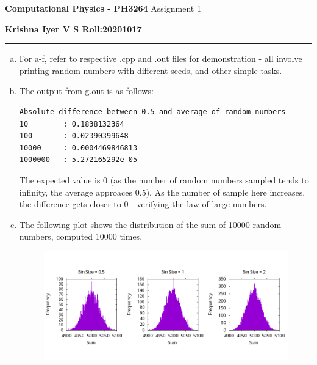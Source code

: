 \documentclass[12 pt]{article}
\begin{document}
\begin{center}
       \large{
       \textbf{Computational Physics - PH3264} \break
	Assignment 1
}
\end{center}

\textbf{Krishna Iyer V S \hfill Roll:20201017}
\hrule 
\vspace{0.1cm}

\begin{enumerate}[a.]

\item
For a-f, refer to respective .cpp and .out files for demonstration - all involve printing random numbers with different seeds, and other simple tasks.

\setcounter{enumi}{6}

\item
The output from g.out is as follows:
\begin{verbatim}
Absolute difference between 0.5 and average of random numbers
10        : 0.1838132364
100       : 0.02390399648
10000     : 0.0004469846813
1000000   : 5.272165292e-05
\end{verbatim}
The expected value is 0 (as the number of random numbers sampled tends to infinity, the average approaces 0.5). As the number of sample here increases, the difference gets closer to 0 - verifying the law of large numbers.

\item
The following plot shows the distribution of the sum of 10000 random numbers, computed 10000 times.

\begin{figure}[htb!]
\centering\includegraphics[width=6.0in]{plots/random_numbers_sum.png}
\end{figure}


\end{enumerate}
\end{document}
